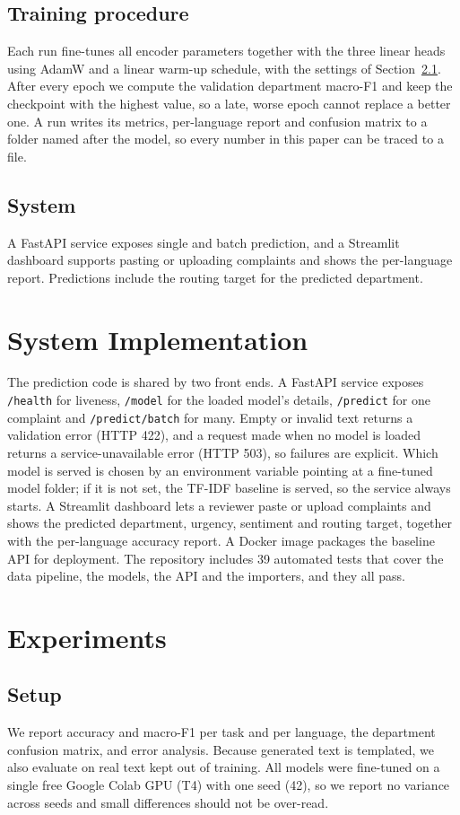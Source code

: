 \documentclass[conference]{IEEEtran}
\begin{document}
\subsection{Training procedure}
Each run fine-tunes all encoder parameters together with the three linear heads using AdamW and a linear warm-up schedule, with the settings of Section~\ref{sec:setup}.
After every epoch we compute the validation department macro-F1 and keep the checkpoint with the highest value, so a late, worse epoch cannot replace a better one.
A run writes its metrics, per-language report and confusion matrix to a folder named after the model, so every number in this paper can be traced to a file.

\subsection{System}
A FastAPI service exposes single and batch prediction, and a Streamlit dashboard supports pasting or uploading complaints and shows the per-language report.
Predictions include the routing target for the predicted department.

\section{System Implementation}
The prediction code is shared by two front ends. A FastAPI service exposes \texttt{/health} for liveness, \texttt{/model} for the loaded model's details, \texttt{/predict} for one complaint and \texttt{/predict/batch} for many.
Empty or invalid text returns a validation error (HTTP 422), and a request made when no model is loaded returns a service-unavailable error (HTTP 503), so failures are explicit.
Which model is served is chosen by an environment variable pointing at a fine-tuned model folder; if it is not set, the TF-IDF baseline is served, so the service always starts.
A Streamlit dashboard lets a reviewer paste or upload complaints and shows the predicted department, urgency, sentiment and routing target, together with the per-language accuracy report.
A Docker image packages the baseline API for deployment. The repository includes 39 automated tests that cover the data pipeline, the models, the API and the importers, and they all pass.

\section{Experiments}
\subsection{Setup}\label{sec:setup}
We report accuracy and macro-F1 per task and per language, the department confusion matrix, and error analysis. Because generated text is templated,
we also evaluate on real text kept out of training. All models were fine-tuned on a single free Google Colab GPU (T4) with one seed (42), so we report no variance across seeds and small differences should not be over-read.
\end{document}
